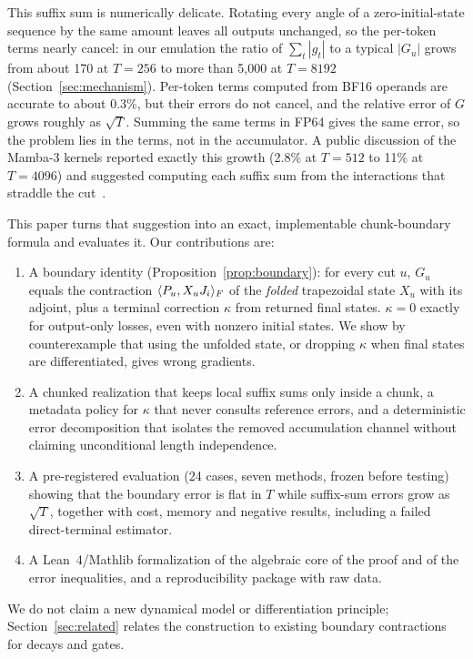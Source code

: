 This suffix sum is numerically delicate. Rotating every angle of a zero-initial-state sequence by the same amount leaves all outputs unchanged, so the per-token terms nearly cancel: in our emulation the ratio of $\sum_t|g_t|$ to a typical $|G_u|$ grows from about 170 at $T=256$ to more than 5{,}000 at $T=8192$ (Section~\ref{sec:mechanism}). Per-token terms computed from BF16 operands are accurate to about 0.3\%, but their errors do not cancel, and the relative error of $G$ grows roughly as $\sqrt T$. Summing the same terms in FP64 gives the same error, so the problem lies in the terms, not in the accumulator. A public discussion of the Mamba-3 kernels reported exactly this growth (2.8\% at $T=512$ to 11\% at $T=4096$) and suggested computing each suffix sum from the interactions that straddle the cut~\cite{johnsonms}.

This paper turns that suggestion into an exact, implementable chunk-boundary formula and evaluates it. Our contributions are:
\begin{enumerate}
\item A boundary identity (Proposition~\ref{prop:boundary}): for every cut $u$, $G_u$ equals the contraction $\langle P_u,X_uJ_i\rangle_F$ of the \emph{folded} trapezoidal state $X_u$ with its adjoint, plus a terminal correction $\kappa$ from returned final states. $\kappa=0$ exactly for output-only losses, even with nonzero initial states. We show by counterexample that using the unfolded state, or dropping $\kappa$ when final states are differentiated, gives wrong gradients.
\item A chunked realization that keeps local suffix sums only inside a chunk, a metadata policy for $\kappa$ that never consults reference errors, and a deterministic error decomposition that isolates the removed accumulation channel without claiming unconditional length independence.
\item A pre-registered evaluation (24 cases, seven methods, frozen before testing) showing that the boundary error is flat in $T$ while suffix-sum errors grow as $\sqrt T$, together with cost, memory and negative results, including a failed direct-terminal estimator.
\item A Lean~4/Mathlib formalization of the algebraic core of the proof and of the error inequalities, and a reproducibility package with raw data.
\end{enumerate}
We do not claim a new dynamical model or differentiation principle; Section~\ref{sec:related} relates the construction to existing boundary contractions for decays and gates.

